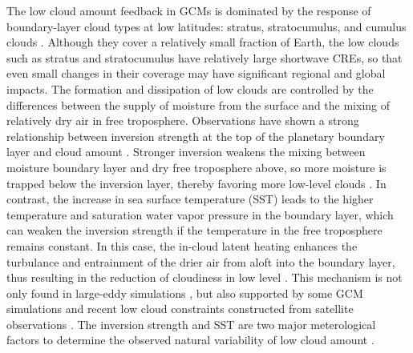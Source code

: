 The low cloud amount feedback in GCMs is dominated by the response of boundary-layer cloud types at low latitudes: stratus, stratocumulus, and cumulus clouds \citep{Ceppi2017}. Although they cover a relatively small fraction of Earth, the low clouds such as stratus and stratocumulus have relatively large shortwave CREs, so that even small changes in their coverage may have significant regional and global impacts. The formation and dissipation of low clouds are controlled by the differences between the supply of moisture from the surface and the mixing of relatively dry air in free troposphere. Observations have shown a strong relationship between inversion strength at the top of the planetary boundary layer and cloud amount \citep{Gordon1992,Klein1993,Wood2006}. Stronger inversion weakens the mixing between moisture boundary layer and dry free troposphere above, so more moisture is trapped below the inversion layer, thereby favoring more low-level clouds \citep[e.g.,][]{Qu2014,Scott2020}. In contrast, the increase in sea surface temperature (SST) leads to the higher temperature and saturation water vapor pressure in the boundary layer, which can weaken the inversion strength if the temperature in the free troposphere remains constant. In this case, the in-cloud latent heating enhances the turbulance and entrainment of the drier air from aloft into the boundary layer, thus resulting in the reduction of cloudiness in low level \citep[e.g.,][]{Rieck2012, Webb2013coupling, Qu2014, Bretherton2015, Brient2016,Myers2016,Ceppi2017relationship,Scott2020}. This mechanism is not only found in large-eddy simulations \citep{Bretherton2015}, but also supported by some GCM simulations \citep[e.g.,][]{Zhang2013CGILS,Myers2016} and recent low cloud constraints constructed from satellite observations \citep{Scott2020,Myers2021}. The inversion strength and SST are two major meterological factors to determine the observed natural variability of low cloud amount \citep[e.g.,][]{Zhou2016}. 

